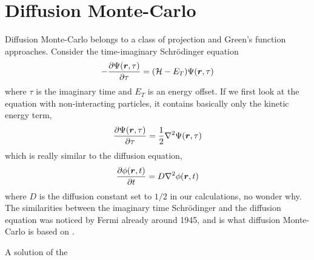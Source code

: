\section{Diffusion Monte-Carlo}
Diffusion Monte-Carlo belongs to a class of projection and Green's function approaches. Consider the time-imaginary Schrödinger equation
\begin{eqnarray}
-\frac{\partial\Psi(\boldsymbol{{r}},\tau)}{\partial\tau}=(\mathcal{H}-E_T)\Psi(\boldsymbol{{r}},\tau)
\end{eqnarray}
where $\tau$ is the imaginary time and $E_T$ is an energy offset. If we first look at the equation with non-interacting particles, it contains basically only the kinetic energy term, 
\begin{equation}
\frac{\partial\Psi(\boldsymbol{{r}},\tau)}{\partial\tau}=\frac{1}{2}\nabla^2\Psi(\boldsymbol{{r}},\tau)
\end{equation}
which is really similar to the diffusion equation,
\begin{equation}
\frac{\partial\phi(\boldsymbol{{r}},t)}{\partial t}=D\nabla^2\phi(\boldsymbol{{r}},t)
\end{equation}
where $D$ is the diffusion constant set to $1/2$ in our calculations, no wonder why. The similarities between the imaginary time Schrödinger and the diffusion equation was noticed by Fermi already around 1945, and is what diffusion Monte-Carlo is based on \cite{metropolis_monte_1949,ceperley_quantum_1986}. 

A solution of the 


